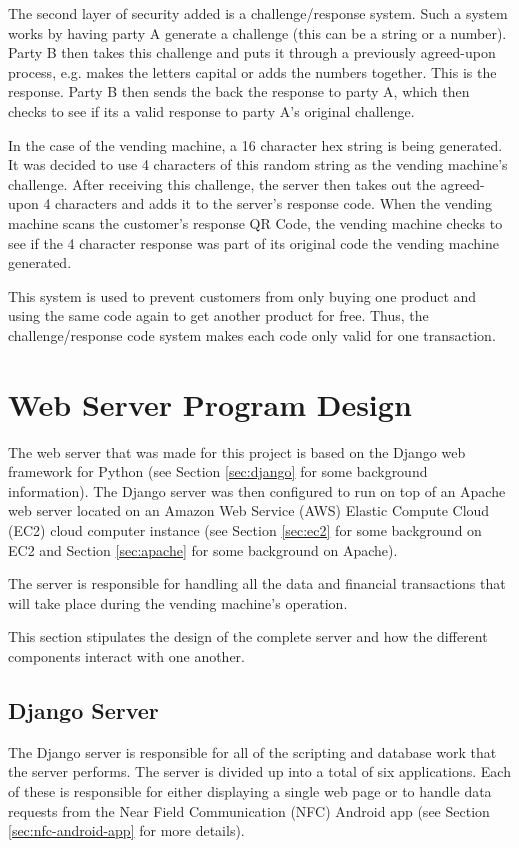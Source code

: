 The second layer of security added is a challenge/response system. Such a system
works by having party A generate a challenge (this can be a string or a number).
Party B then takes this challenge and puts it through a previously agreed-upon
process, e.g. makes the letters capital or adds the numbers together. This
is the response. Party B then sends the back the response to party A, which then
checks to see if its a valid response to party A's original challenge.

In the case of the vending machine, a 16 character hex string is being
generated. It was decided to use 4 characters of this random string as the
vending machine's challenge. After receiving this challenge, the server then
takes out the agreed-upon 4 characters and adds it to the server's response
code. When the vending machine scans the customer's response QR Code, the
vending machine checks to see if the 4 character response was part of its
original code the vending machine generated.

This system is used to prevent customers from only buying one product and using
the same code again to get another product for free. Thus, the
challenge/response code system makes each code only valid for one transaction.

\section{Web Server Program Design}

The web server that was made for this project is based on the Django web framework for Python
(see Section \ref{sec:django} for some background information). The Django server was then
configured to run on top of an Apache web server located on an Amazon Web Service (AWS) Elastic
Compute Cloud (EC2) cloud computer instance (see Section \ref{sec:ec2} for some background
on EC2 and Section \ref{sec:apache} for some background on Apache).

The server is responsible for handling all the data and financial transactions that will take
place during the vending machine's operation. 

This section stipulates the design of the complete server and how the different components
interact with one another. 

\subsection{Django Server}

The Django server is responsible for all of the scripting and database work that the server
performs. The server is divided up into a total of six applications. Each of these is
responsible for either displaying a single web page or to handle data requests from the
Near Field Communication (NFC) Android app (see Section \ref{sec:nfc-android-app} for more
details).

